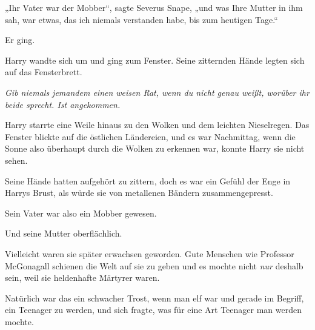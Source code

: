 „Ihr Vater war der Mobber“, sagte Severus Snape, „und was Ihre Mutter in ihm sah, war etwas, das ich niemals verstanden habe, bis zum heutigen Tage.“

Er ging.

Harry wandte sich um und ging zum Fenster. Seine zitternden Hände legten sich auf das Fensterbrett.

\emph{Gib niemals jemandem einen weisen Rat, wenn du nicht genau weißt, worüber ihr beide sprecht. Ist angekommen.}

Harry starrte eine Weile hinaus zu den Wolken und dem leichten Nieselregen. Das Fenster blickte auf die östlichen Ländereien, und es war Nachmittag, wenn die Sonne also überhaupt durch die Wolken zu erkennen war, konnte Harry sie nicht sehen.

Seine Hände hatten aufgehört zu zittern, doch es war ein Gefühl der Enge in Harrys Brust, als würde sie von metallenen Bändern zusammengepresst.

Sein Vater war also ein Mobber gewesen.

Und seine Mutter oberflächlich.

Vielleicht waren sie später erwachsen geworden. Gute Menschen wie Professor McGonagall schienen die Welt auf sie zu geben und es mochte nicht \emph{nur} deshalb sein, weil sie heldenhafte Märtyrer waren.

Natürlich war das ein schwacher Trost, wenn man elf war und gerade im Begriff, ein Teenager zu werden, und sich fragte, was für eine Art Teenager man werden mochte.

